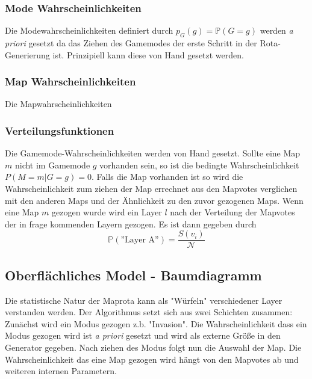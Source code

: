         \subsubsection{Mode Wahrscheinlichkeiten}
            Die Modewahrscheinlichkeiten definiert durch $p_G(g)=\mathbb{P}(G=g)$ werden \textit{a priori} gesetzt da das Ziehen des Gamemodes der erste Schritt in der Rota-Generierung ist.
            Prinzipiell kann diese von Hand gesetzt werden. 
        \subsubsection{Map Wahrscheinlichkeiten}
            Die Mapwahrscheinlichkeiten              
        \subsubsection{Verteilungsfunktionen}
        Die Gamemode-Wahrscheinlichkeiten werden von Hand gesetzt. 
        Sollte eine Map $m$ nicht im Gamemode $g$ vorhanden sein, so ist die bedingte Wahrscheinlichkeit $P(M=m|G=g) = 0$. 
        Falls die Map vorhanden ist so wird die Wahrscheinlichkeit zum ziehen der Map errechnet aus den Mapvotes verglichen mit den anderen Maps und der Ähnlichkeit zu den zuvor gezogenen Maps.
        Wenn eine Map $m$ gezogen wurde wird ein Layer $l$ nach der Verteilung der Mapvotes der in frage kommenden Layern gezogen. 
        Es ist dann gegeben durch 
        \begin{equation}
            \mathbb{P}(\text{''Layer A''}) = \frac{S(v_i)}{\mathcal{N}}
        \end{equation}
    \subsection{Oberflächliches Model - Baumdiagramm}
        Die statistische Natur der Maprota kann als "Würfeln" verschiedener Layer verstanden werden. 
        Der Algorithmus setzt sich aus zwei Schichten zusammen: Zunächst wird ein Modus gezogen z.b. "Invasion". 
        Die Wahrscheinlichkeit dass ein Modus gezogen wird ist \textit{a priori} gesetzt und wird als externe Größe in den Generator gegeben.
        Nach ziehen des Modus folgt nun die Auswahl der Map. 
        Die Wahrscheinlichkeit das eine Map gezogen wird hängt von den Mapvotes ab und weiteren internen Parametern. 

